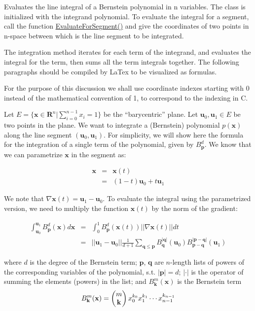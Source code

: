 Evaluates the line integral of a Bernstein polynomial in n variables. The class is initialized with the integrand polynomial. To evaluate the integral for a segment, call the function \hyperlink{classnmr_bernstein_polynomial_line_integral_aa0715104b8922688ed16042b410f7d82}{Evaluate\-For\-Segment()} and give the coordinates of two points in n-\/space between which is the line segment to be integrated.

The integration method iterates for each term of the integrand, and evaluates the integral for the term, then sums all the term integrals together. The following paragraphs should be compiled by La\-Tex to be visualized as formulas.

For the purpose of this discussion we shall use coordinate indexes starting with 0 instead of the mathematical convention of 1, to correspond to the indexing in C.

Let $ E = \{\mathbf{x} \in \mathbf{R}^n | \sum_{i=0}^{n-1} x_i = 1\} $ be the ``barycentric'' plane. Let $ \mathbf{u}_0, \mathbf{u}_1 \in E $ be two points in the plane. We want to integrate a (Bernstein) polynomial $ p(\mathbf{x}) $ along the line segment $ (\mathbf{u}_0, \mathbf{u}_1) $. For simplicity, we will show here the formula for the integration of a single term of the polynomial, given by $ B_{\mathbf{p}}^{d} $. We know that we can parametrize $ \mathbf{x} $ in the segment as\-:

\begin{eqnarray*} \mathbf{x} & = & \mathbf{x}(t) \\ & = & (1-t)\mathbf{u}_0 + t\mathbf{u}_1 \end{eqnarray*}

We note that $\nabla \mathbf{x}(t) = \mathbf{u}_1 - \mathbf{u}_0$. To evaluate the integral using the parametrized version, we need to multiply the function $\mathbf{x}(t)$ by the norm of the gradient\-:

\begin{eqnarray*} \int_{\mathbf{u}_0}^{\mathbf{u}_1} B_{\mathbf{p}}^{d}(\mathbf{x}) d\mathbf{x} & = & \int_{0}^{1} B_{\mathbf{p}}^{d} (\mathbf{x}(t)) || \nabla \mathbf{x}(t) || dt \\ & = & ||\mathbf{u}_1 - \mathbf{u}_0 || \frac{1}{d+1} \sum_{\mathbf{q} \leq \mathbf{p}} B_{\mathbf{q}}^{|\mathbf{q}|} (\mathbf{u}_0) B_{\mathbf{p} - \mathbf{q}}^{|\mathbf{p} - \mathbf{q}|} (\mathbf{u}_1) \end{eqnarray*}

where $d$ is the degree of the Bernstein term; $\mathbf{p}$, $\mathbf{q}$ are $n$-\/length lists of powers of the corresponding variables of the polynomial, s.\-t. $|\mathbf{p}| = d$; $|\cdot|$ is the operator of summing the elements (powers) in the list; and $B_{\mathbf{k}}^m(\mathbf{x})$ is the Bernstein term \[ B_\mathbf{k}^m(\mathbf{x}) = \left( \begin{array}{@{}c@{}} m \\ \mathbf{k} \end{array} \right) x_0^{k_0} x_1^{k_1} \cdots x_{n-1}^{k_{n-1}} \]

